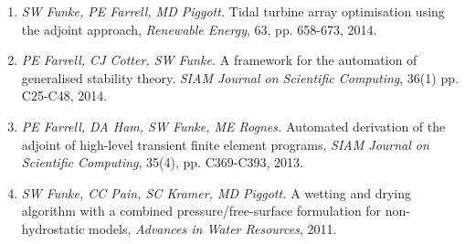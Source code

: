 \documentclass[11pt]{article}
\begin{document}
\begin{enumerate}
\item \textit{SW Funke, PE Farrell, MD Piggott.} Tidal turbine array optimisation using the adjoint approach, \textit{Renewable Energy}, 63, pp. 658-673,  2014.
\item \textit{PE Farrell, CJ Cotter, SW Funke.} A framework for the automation of generalised stability theory. \textit{SIAM Journal on     Scientific Computing}, 36(1) pp. C25-C48, 2014.
\item \textit{PE Farrell, DA Ham, SW Funke, ME Rognes.} Automated derivation of the adjoint of high-level transient finite element programs, \textit{SIAM Journal on Scientific Computing}, 35(4), pp. C369-C393, 2013.
\item \textit{SW Funke, CC Pain, SC Kramer, MD Piggott.} A wetting and drying algorithm with a combined pressure/free-surface formulation for non-hydrostatic models, \textit{Advances in Water Resources}, 2011.
\end{enumerate}

\end{document}
